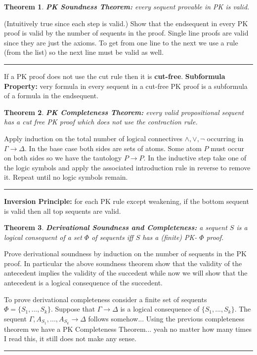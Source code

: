 \documentclass[twoside]{article}
\newcounter{lecnum}
\newtheorem{theorem}{Theorem}[lecnum]
\newenvironment{proof}{{\bf Proof:}}{\hfill\rule{2mm}{2mm}}
\begin{document}
\begin{theorem}
\textbf{PK Soundness Theorem:} every sequent provable in PK is valid.
\end{theorem}
\begin{proof}
(Intuitively true since each step is valid.) Show that the endsequent in every PK proof is valid by the number of sequents in the proof. Single line proofs are valid since they are just the axioms. To get from one line to the next we use a rule (from the list) so the next line must be valid as well. 
\end{proof}

If a PK proof does not use the cut rule then it is \textbf{cut-free}. \textbf{Subformula Property:} very formula in every sequent in a cut-free PK proof is a subformula of a formula in the endsequent. 

\begin{theorem}
\textbf{PK Completeness Theorem:} every valid propositional sequent has a cut free PK proof which does not use the contraction rule.
\end{theorem}
\begin{proof}
Apply induction on the total number of logical connectives $\land, \lor, \lnot$ occurring in $\Gamma \rightarrow \Delta$. In the base case both sides are sets of atoms. Some atom $P$ must occur on both sides so we have the tautology $P \rightarrow P$. In the inductive step take one of the logic symbols and apply the associated introduction rule in reverse to remove it. Repeat until no logic symbols remain. 
\end{proof}

\textbf{Inversion Principle:} for each PK rule except weakening, if the bottom sequent is valid then all top sequents are valid. 

\begin{theorem}
\textbf{Derivational Soundness and Completeness:} a sequent $S$ is a logical consequent of a set $\Phi$ of sequents iff $S$ has a (finite) PK- $\Phi$ proof. 
\end{theorem}
\begin{proof}
Prove derivational soundness by induction on the number of sequents in the PK proof. In particular the above soundness theorem show that the validity of the antecedent implies the validity of the succedent while now we will show that the antecedent is a logical consequence of the succedent. 

To prove derivational completeness consider a finite set of sequents $\Phi = \{S_1, ..., S_k\}$. Suppose that $\Gamma \rightarrow \Delta$ is a logical consequence of $\{S_1, ..., S_k\}$. The sequent $\Gamma, A_{S_1}, ..., A_{S_k} \rightarrow \Delta$ follows somehow... Using the previous completeness theorem we have a PK Completeness Theorem... yeah no matter how many times I read this, it still does not make any sense.   
\end{proof}
\end{document}
